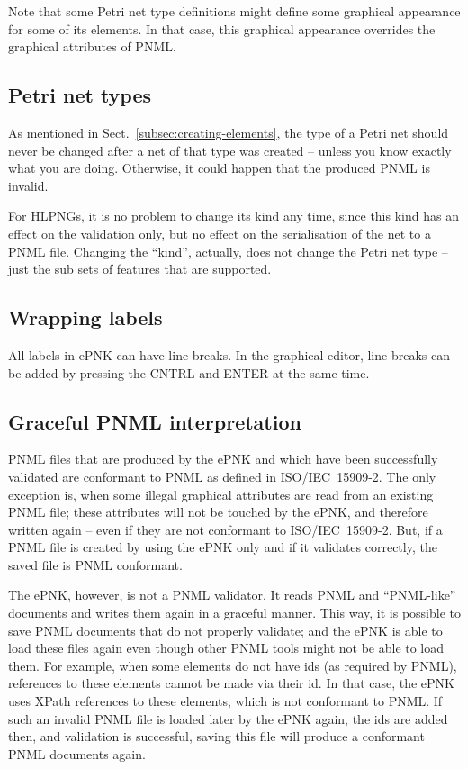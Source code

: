 Note that some Petri net type definitions might define some graphical appearance
for some of its elements. In that case, this graphical appearance overrides the
graphical attributes of PNML.

\subsection{Petri net types}

As mentioned in Sect.~\ref{subsec:creating-elements}, the type of a Petri net
should never be changed after a net of that type was created --
unless you know exactly what you are doing. Otherwise, it could happen
that the produced PNML is invalid.

For HLPNGs, it is no problem to change its kind any time, since this
kind has an effect on the validation only, but no effect on the
serialisation of the net to a PNML file. Changing the ``kind'', actually,
does not change the Petri net type -- just the sub sets of features that
are supported.

 
\subsection{Wrapping labels}

All labels in ePNK can have line-breaks. In the graphical editor,
line-breaks can be added by pressing the CNTRL and ENTER at the same time.

\subsection{Graceful PNML interpretation}  
\label{subsec:graceful-PNML}

PNML files that are produced by the ePNK and which have been successfully
validated are conformant to PNML as defined in ISO/IEC~15909-2. The
only exception is, when some illegal graphical attributes are read from an
existing PNML file; these attributes will not be touched by the ePNK, and
therefore written again -- even if they are not conformant to ISO/IEC~15909-2.
But, if a PNML file is created by using the ePNK only and if it validates
correctly, the saved file is PNML conformant.

The ePNK, however, is not a PNML validator. It reads PNML and ``PNML-like''
documents and writes them again in a graceful manner. This way, it is possible
to save PNML documents that do not properly validate; and the ePNK is able to
load these files again even though other PNML tools might not be able to
load them. For example, when some elements do not have ids (as required
by PNML), references to these elements cannot be made via their id. In that
case, the ePNK uses XPath references to these elements, which is not conformant
to PNML. If such an invalid PNML file is loaded later by the ePNK again,
the ids are added then, and validation is successful, saving this
file  will produce a conformant PNML documents again.

